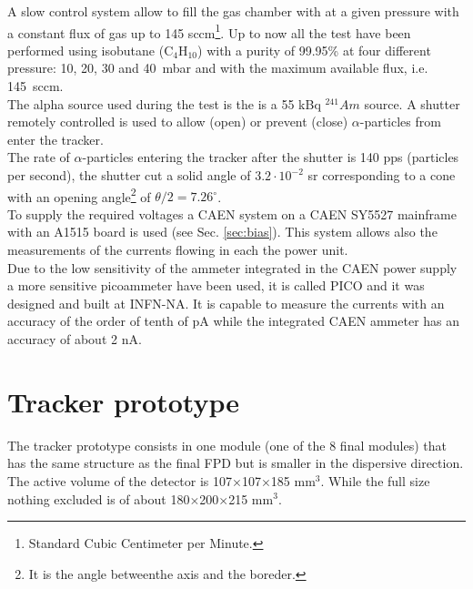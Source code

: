 \documentclass[a4paper, 11 pt]{report}
\begin{document}
 
A slow control system allow to fill the gas chamber with at a given pressure with a constant
flux of gas up to 145 sccm\footnote{Standard Cubic Centimeter per Minute.}.  
Up to now all the test have been performed using isobutane ($\mbox{C}_4\mbox{H}_{10}$) with a 
purity of 99.95\% at four different pressure: 10, 20, 30 and 40~mbar and with the maximum 
available flux, i.e. 145~sccm.\\

The alpha source used during the test is the is a 55 kBq $^{241}Am$ source. A shutter remotely 
controlled is used to allow (open) or prevent (close) $\alpha$-particles from enter the tracker.\\
The rate of $\alpha$-particles entering the tracker after the shutter is 140 pps (particles per 
second), the shutter cut a solid angle of $3.2\cdot10^{-2}$ sr corresponding to a cone with
an opening angle\footnote{It is the angle betweenthe axis and the boreder.} of $\theta/2=7.26^{\circ}$.\\

To supply the required voltages a CAEN system on a CAEN SY5527 mainframe with an A1515 board 
is used (see Sec. \ref{sec:bias}). This system allows also the measurements of the currents flowing in each the power unit.\\

Due to the low sensitivity of the ammeter integrated in the CAEN power supply a more sensitive 
picoammeter have been used, it is called PICO and it was designed and built at INFN-NA.
It is capable to measure the currents with an accuracy of the order of tenth of pA
while the integrated CAEN ammeter has an accuracy of about 2 nA.


\section{Tracker prototype}
\label{sec:prototype}
The tracker prototype consists in one module (one of the 8 final modules) that has the same 
structure as the final FPD but is smaller in the dispersive direction.\\
The active volume of the detector is 107$\times$107$\times$185 mm$^{3}$. While the full size 
nothing excluded is of about 180$\times$200$\times$215 mm$^{3}$. 
\end{document}

